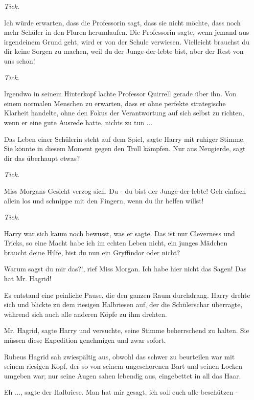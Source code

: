 \emph{Tick}.

\glqq{}Ich würde erwarten, dass die Professorin sagt, dass sie nicht möchte, dass
noch mehr Schüler in den Fluren herumlaufen. Die Professorin sagte, wenn jemand
aus irgendeinem Grund geht, wird er von der Schule verwiesen. Vielleicht
brauchst du dir keine Sorgen zu machen, weil du der Junge-der-lebte bist, aber
der Rest von uns schon!\grqq{}

\emph{Tick}.

Irgendwo in seinem Hinterkopf lachte Professor Quirrell gerade über ihn. Von
einem normalen Menschen zu erwarten, dass er ohne perfekte strategische Klarheit
handelte, ohne den Fokus der Verantwortung auf sich selbst zu richten, wenn er
eine gute Ausrede hatte, nichts zu tun ...

\glqq{}Das Leben einer Schülerin steht auf dem Spiel\grqq{}, sagte Harry mit
ruhiger Stimme. \glqq{}Sie könnte in diesem Moment gegen den Troll kämpfen. Nur
aus Neugierde, sagt dir das überhaupt etwas?\grqq{}

\emph{Tick}.

Miss Morgans Gesicht verzog sich. \glqq{}Du - du bist der Junge-der-lebte! Geh
einfach allein los und schnippe mit den Fingern, wenn du ihr helfen
willst!\grqq{}

\emph{Tick}.

Harry war sich kaum noch bewusst, was er sagte. \glqq{}Das ist nur Cleverness und
Tricks, so eine Macht habe ich im echten Leben nicht, ein junges Mädchen braucht
deine Hilfe, bist du nun ein Gryffindor oder nicht?\grqq{}

\glqq{}Warum sagst du mir das?!\grqq{}, rief Miss Morgan. \glqq{}Ich habe hier
nicht das Sagen! Das hat Mr. Hagrid!\grqq{}

Es entstand eine peinliche Pause, die den ganzen Raum durchdrang. Harry drehte
sich und blickte zu dem riesigen Halbriesen auf, der die Schülerschar überragte,
während sich auch alle anderen Köpfe zu ihm drehten.

\glqq{}Mr. Hagrid\grqq{}, sagte Harry und versuchte, seine Stimme beherrschend zu
halten. \glqq{}Sie müssen diese Expedition genehmigen und zwar sofort.\grqq{}

Rubeus Hagrid sah zwiespältig aus, obwohl das schwer zu beurteilen war mit
seinem riesigen Kopf, der so von seinem ungeschorenen Bart und seinen Locken
umgeben war; nur seine Augen sahen lebendig aus, eingebettet in all das Haar.

\glqq{}Eh ...\grqq{}, sagte der Halbriese. \glqq{}Man hat mir gesagt, ich soll
euch alle beschützen -\grqq{}

